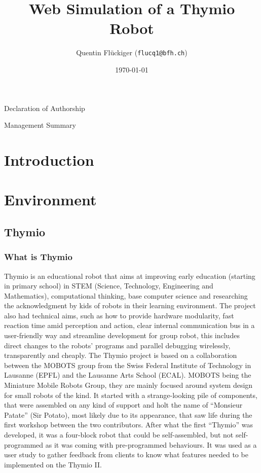 \documentclass{scrartcl}
\begin{document}
\title{Web Simulation of a Thymio Robot}
\date{\today}   %
\author{Quentin Flückiger (\texttt{flucq1@bfh.ch})}





\maketitle
\clearpage

Declaration of Authorship
\clearpage
\clearpage

Management Summary
\clearpage
\clearpage

\tableofcontents
\clearpage

\section{Introduction}

\section{Environment}

\subsection{Thymio}
\subsubsection{What is Thymio} 

Thymio is an educational robot that aims at improving early education (starting in primary school) in STEM (Science, Technology, Engineering and Mathematics), computational thinking, base computer science and researching the acknowledgment by kids of robots in their learning environment. The project also had technical aims, such as how to provide hardware modularity, fast reaction time amid perception and action, clear internal communication bus in a user-friendly way and streamline development for group robot, this includes direct changes to the robots’ programs and parallel debugging wirelessly, transparently and cheaply.
The Thymio project is based on a collaboration between the MOBOTS group from the Swiss Federal Institute of Technology in Lausanne (EPFL) and the Lausanne Arts School (ECAL). MOBOTS being the Miniature Mobile Robots Group, they are mainly focused around system design for small robots of the kind. It started with a strange-looking pile of components, that were assembled on any kind of support and holt the name of “Monsieur Patate” (Sir Potato), most likely due to its appearance, that saw life during the first workshop between the two contributors. After what the first “Thymio” was developed, it was a four-block robot that could be self-assembled, but not self-programmed as it was coming with pre-programmed behaviours. It was used as a user study to gather feedback from clients to know what features needed to be implemented on the Thymio II.
\end{document}
